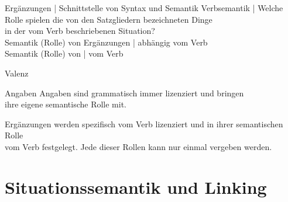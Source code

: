 \begin{frame}
  {Ergänzungen | Schnittstelle von Syntax und Semantik}
  \onslide<+->
  \onslide<+->
  Verbsemantik | Welche \alert{Rolle} spielen die von den Satzgliedern bezeichneten Dinge\\
  in der vom Verb beschriebenen Situation?\\
  \Zeile
  \onslide<+->
  Semantik (\alert{Rolle}) von \alert{Ergänzungen} | \alert{abhängig} vom Verb\\
  \onslide<+->
  \Viertelzeile
  Semantik (\alert{Rolle}) von  |  vom Verb\\
  \Halbzeile
  \pause
  \begin{exe}
    \ex\label{ex:valenz071}
    \begin{xlist}
      \pause
      \pause
    \end{xlist}
  \end{exe}
\end{frame}

\begin{frame}
  {Valenz}
  \onslide<+->
  \onslide<+->
  \begin{block}{Angaben}
    \alert{Angaben} sind grammatisch immer lizenziert und bringen\\
    ihre eigene semantische Rolle mit.
  \end{block}
  \Zeile
  \onslide<+->
  \begin{block}{Ergänzungen}
     werden spezifisch vom Verb lizenziert und in ihrer semantischen Rolle\\
    vom Verb festgelegt. Jede dieser Rollen kann nur einmal vergeben werden.
  \end{block}
\end{frame}

\section{Situationssemantik und Linking}

